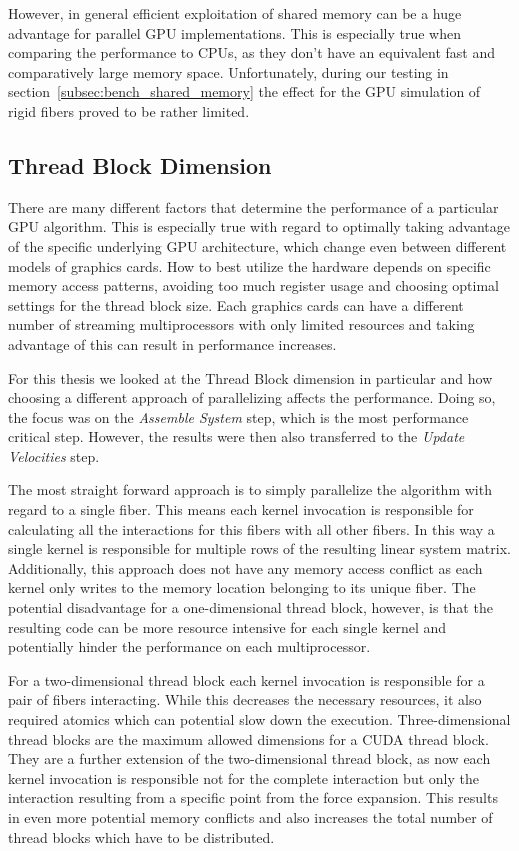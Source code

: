 \documentclass[a4paper,11pt]{kth-mag}
\begin{document}
However, in general efficient exploitation of shared memory can be a huge advantage for parallel GPU implementations. This is especially true when comparing the performance to CPUs, as they don't have an equivalent fast and comparatively large memory space. Unfortunately, during our testing in section~\ref{subsec:bench_shared_memory} the effect for the GPU simulation of rigid fibers proved to be rather limited.

\subsection{Thread Block Dimension}
\label{subsec:bench_thread_block}

There are many different factors that determine the performance of a particular GPU algorithm. This is especially true with regard to optimally taking advantage of the specific underlying GPU architecture, which change even between different models of graphics cards. How to best utilize the hardware depends on specific memory access patterns, avoiding too much register usage and choosing optimal settings for the thread block size. Each graphics cards can have a different number of streaming multiprocessors with only limited resources and taking advantage of this can result in performance increases.

For this thesis we looked at the Thread Block dimension in particular and how choosing a different approach of parallelizing affects the performance. Doing so, the focus was on the \emph{Assemble System} step, which is the most performance critical step. However, the results were then also transferred to the \emph{Update Velocities} step.

The most straight forward approach is to simply parallelize the algorithm with regard to a single fiber. This means each kernel invocation is responsible for calculating all the interactions for this fibers with all other fibers. In this way a single kernel is responsible for multiple rows of the resulting linear system matrix. Additionally, this approach does not have any memory access conflict as each kernel only writes to the memory location belonging to its unique fiber. The potential disadvantage for a one-dimensional thread block, however, is that the resulting code can be more resource intensive for each single kernel and potentially hinder the performance on each multiprocessor.

For a two-dimensional thread block each kernel invocation is responsible for a pair of fibers interacting. While this decreases the necessary resources, it also required atomics which can potential slow down the execution. Three-dimensional thread blocks are the maximum allowed dimensions for a CUDA thread block. They are a further extension of the two-dimensional thread block, as now each kernel invocation is responsible not for the complete interaction but only the interaction resulting from a specific point from the force expansion. This results in even more potential memory conflicts and also increases the total number of thread blocks which have to be distributed.
\end{document}
